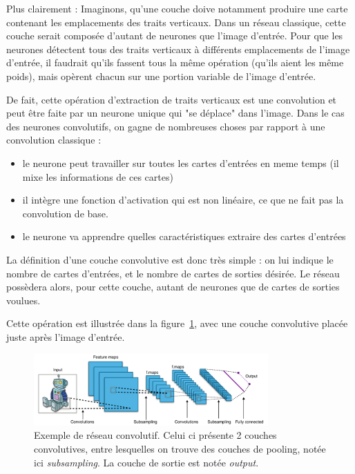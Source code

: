 Plus clairement : Imaginons, qu'une couche doive notamment produire une carte
contenant les emplacements des traits verticaux. Dans un réseau classique,
cette couche serait composée d'autant de neurones que l'image d'entrée.
Pour que les neurones détectent tous des traits verticaux à différents
emplacements de l'image d'entrée, il faudrait qu'ils fassent tous la même
opération (qu'ils aient les même poids), mais opèrent chacun sur une portion variable de l'image d'entrée.

De fait, cette opération d'extraction de traits verticaux est une convolution
et peut être faite par un neurone unique qui "se déplace" dans l'image.
Dans le cas des neurones convolutifs, on gagne de nombreuses choses par rapport
à une convolution classique :
\begin{itemize}
\item le neurone peut travailler sur toutes les cartes d'entrées en meme temps
(il mixe les informations de ces cartes)
\item il intègre une fonction d'activation qui est non linéaire, ce que ne fait
pas la convolution de base.
\item le neurone va apprendre quelles caractéristiques extraire des cartes
d'entrées
\end{itemize}

La définition d'une couche convolutive est donc très simple :
on lui indique le nombre de cartes d'entrées, et le nombre de cartes de sorties
désirée. Le réseau possèdera alors, pour cette couche, autant de neurones
que de cartes de sorties voulues.

Cette opération est illustrée dans la figure~\ref{fig:exCNN}, avec une couche
convolutive placée juste après l'image d'entrée.

\begin{figure}[h!]
\centering
\includegraphics[width=0.8\textwidth]{./images/exCNN.png}
\caption[Exemple de réseau convolutif]{ Exemple de réseau convolutif. Celui ci présente 2 couches convolutives, entre lesquelles on trouve des couches de
pooling, notée ici \textit{subsampling}. La couche de sortie est notée \textit{output}.
\label{fig:exCNN}
}
\end{figure}

